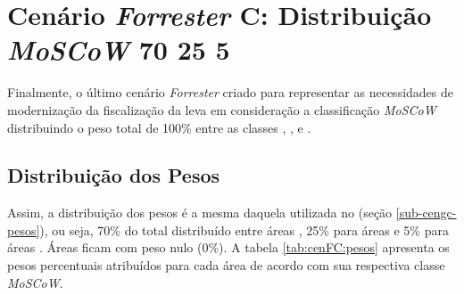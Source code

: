 \newcommand{\cenFC}{Cenário \emph{Forrester} C: Distribuição \emph{MoSCoW} 70 25 5} 
\section{\cenFC}
\label{sec-cenfc}

    Finalmente, o último cenário \emph{Forrester} criado para representar as necessidades de modernização da fiscalização da \CLDF leva em consideração a classificação \emph{MoSCoW} distribuindo o peso total de 100\% entre as classes \MUST, \SHOULD, \COULD e \WOULD. 

\subsection*{Distribuição dos Pesos}    

    Assim, a distribuição dos pesos é a mesma daquela utilizada no \cenGC \xspace (seção \ref{sub-cengc-pesos}), ou seja, 70\% do total distribuído entre áreas \MUST, 25\% para áreas \SHOULD e 5\% para áreas \COULD. Áreas \WOULD ficam com peso nulo (0\%). A tabela \ref{tab:cenFC:pesos} apresenta os pesos percentuais atribuídos para cada área de acordo com sua respectiva classe \emph{MoSCoW}.

